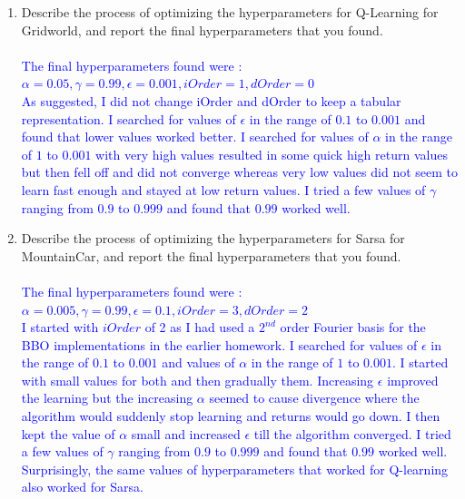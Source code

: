 \documentclass[]{article}
\begin{document}
\begin{enumerate}
    \item Describe the process of optimizing the hyperparameters for Q-Learning for Gridworld, and report the final hyperparameters that you found.
    \\\\
    \textcolor{blue}{
    	The final hyperparameters found were :\\
    	$
    	\alpha  = 0.05,
    	\gamma = 0.99,
    	\epsilon = 0.001,
    	iOrder = 1,
    	dOrder = 0
    	$\\
    	As suggested, I did not change iOrder and dOrder to keep a tabular representation. I searched for values of $\epsilon$ in the range of $0.1$ to $0.001$ and found that lower values worked better. I searched for values of $\alpha$ in the range of $1$ to $0.001$ with very high values resulted in some quick high return values but then fell off and did not converge whereas very low values did not seem to learn fast enough and stayed at low return values. I tried a few values of $\gamma$ ranging from $0.9$ to $0.999$ and found that $0.99$ worked well.
    }


    \item Describe the process of optimizing the hyperparameters for Sarsa for MountainCar, and report the final hyperparameters that you found.
    \\\\
    \textcolor{blue}{
    	The final hyperparameters found were :\\
    	$
    	\alpha  = 0.005,
    	\gamma = 0.99,
    	\epsilon = 0.1,
    	iOrder = 3,
    	dOrder = 2
    	$\\
    	I started with $iOrder$ of 2 as I had used a $2^{nd}$ order Fourier basis for the BBO implementations in the earlier homework. I searched for values of $\epsilon$ in the range of $0.1$ to $0.001$ and values of $\alpha$ in the range of $1$ to $0.001$.  I started with small values for both and then gradually them. Increasing $\epsilon$ improved the learning but the increasing $\alpha$ seemed to cause divergence where the algorithm would suddenly stop learning and returns would go down. I then kept the value of $\alpha$ small and increased $\epsilon$ till the algorithm converged. I tried a few values of $\gamma$ ranging from $0.9$ to $0.999$ and found that $0.99$ worked well. Surprisingly, the same values of hyperparameters that worked for Q-learning also worked for Sarsa.
    }


\end{enumerate}
\end{document}
